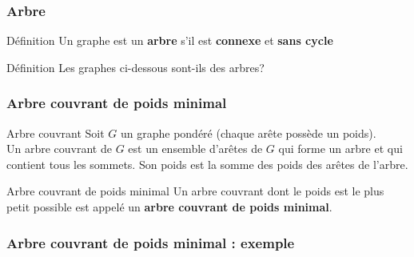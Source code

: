 \documentclass{beamer}
\begin{document}
\begin{frame}[fragile]
    \frametitle{Arbre}
    \begin{exampleblock}{Définition}
        Un graphe est un \textbf{arbre} s'il est \textbf{connexe} et \textbf{sans cycle}
    \end{exampleblock}
    \pause
    \vspace{\baselineskip}

    \begin{alertblock}{Définition}
        Les graphes ci-dessous sont-ils des arbres?
    \end{alertblock}

    \begin{figure}
        \hspace{1.5cm}
    \end{figure}
\end{frame}


\begin{frame}
    \frametitle{Arbre couvrant de poids minimal}
    \begin{exampleblock}{Arbre couvrant}
        Soit $G$ un graphe pondéré (chaque arête possède un poids).\\
        Un arbre couvrant de $G$ est un ensemble d'arêtes de $G$ qui forme un arbre et qui contient tous les sommets.
        Son poids est la somme des poids des arêtes de l'arbre.
    \end{exampleblock}
    \pause
    \vspace{\baselineskip}

    \begin{exampleblock}{Arbre couvrant de poids minimal}
        Un arbre couvrant dont le poids est le plus petit possible est appelé un \textbf{arbre couvrant de poids minimal}.
    \end{exampleblock}
\end{frame}

\begin{frame}
    \frametitle{Arbre couvrant de poids minimal : exemple}
    \begin{figure}
    \end{figure}
\end{frame}
\end{document}

